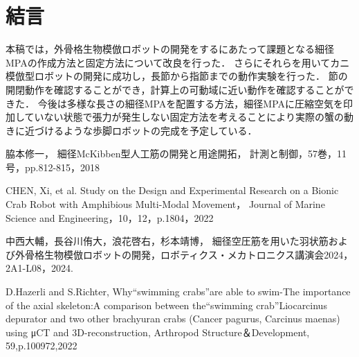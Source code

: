 \documentclass{jarticle}
\begin{document}

\section{結言}
本稿では，外骨格生物模倣ロボットの開発をするにあたって課題となる細径MPAの作成方法と固定方法について改良を行った．
さらにそれらを用いてカニ模倣型ロボットの開発に成功し，長節から指節までの動作実験を行った．
節の開閉動作を確認することができ，計算上の可動域に近い動作を確認することができた．
今後は多様な長さの細径MPAを配置する方法，細径MPAに圧縮空気を印加していない状態で張力が発生しない固定方法を考えることにより実際の蟹の動きに近づけるような歩脚ロボットの完成を予定している．


\begin{thebibliography}{99}
  脇本修一，
  細径McKibben型人工筋の開発と用途開拓，
  計測と制御，57巻，11号，pp.812-815，2018
  
  CHEN, Xi, et al. Study on the Design and Experimental Research on a Bionic Crab Robot with Amphibious Multi-Modal Movement， Journal of Marine Science and Engineering，10，12，p.1804，2022
  
  中西大輔，長谷川侑大，浪花啓右，杉本靖博，
  細径空圧筋を用いた羽状筋および外骨格生物模倣ロボットの開発，ロボティクス・メカトロニクス講演会2024，2A1-L08，2024.

  D.Hazerli and S.Richter,
  Why“swimming crabs”are able to swim-The importance of the axial skeleton:A comparison between the“swimming crab”Liocarcinus depurator and two other brachyuran crabs (Cancer pagurus, Carcinus maenas) using μCT and 3D-reconstruction,
  Arthropod Structure＆Development,
  59,p.100972,2022

\end{thebibliography}
\end{document}
